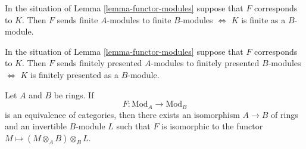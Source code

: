 \begin{remark}
\label{remark-finite}
In the situation of Lemma \ref{lemma-functor-modules}
suppose that $F$ corresponds to $K$. Then
$F$ sends finite $A$-modules to finite $B$-modules
$\Leftrightarrow$ $K$ is finite as a $B$-module.
\end{remark}

\begin{remark}
\label{remark-finite-presentation}
In the situation of Lemma \ref{lemma-functor-modules}
suppose that $F$ corresponds to $K$. Then
$F$ sends finitely presented $A$-modules to finitely presented $B$-modules
$\Leftrightarrow$ $K$ is finitely presented as a $B$-module.
\end{remark}

\begin{lemma}
\label{lemma-functor-equivalence}
Let $A$ and $B$ be rings. If
$$
F : \text{Mod}_A \longrightarrow \text{Mod}_B
$$
is an equivalence of categories, then there exists an isomorphism
$A \to B$ of rings and an invertible $B$-module $L$ such that
$F$ is isomorphic to the functor $M \mapsto (M \otimes_A B) \otimes_B L$.
\end{lemma}


